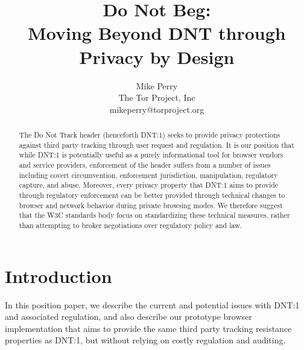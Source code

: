 \documentclass[letterpaper,11pt]{llncs}
\begin{document}
\title{Do Not Beg:\\Moving Beyond DNT through Privacy by Design}

\author{Mike Perry \\ The Tor Project, Inc \\ mikeperry@torproject.org}


\maketitle
\pagestyle{plain}

\begin{abstract}

The Do Not Track header (henceforth DNT:1) seeks to provide privacy
protections against third party tracking through user request and regulation.
It is our position that while DNT:1 is potentially useful as a purely
informational tool for browser vendors and service providers, enforcement of
the header suffers from a number of issues including covert circumvention,
enforcement jurisdiction, manipulation, regulatory capture, and abuse. Moreover,
every privacy property that DNT:1 aims to provide through regulatory
enforcement can be better provided through technical changes to browser and
network behavior during private browsing modes. We therefore suggest that the
W3C standards body focus on standardizing these technical measures, rather
than attempting to broker negotiations over regulatory policy and law.

\end{abstract}
 
%   

\section{Introduction}


In this position paper, we describe the current and potential issues with
DNT:1 and associated regulation, and also describe our prototype browser
implementation\cite{torbrowser} that aims to provide the same third party tracking resistance
properties as DNT:1, but without relying on costly regulation and auditing.
\end{document}
